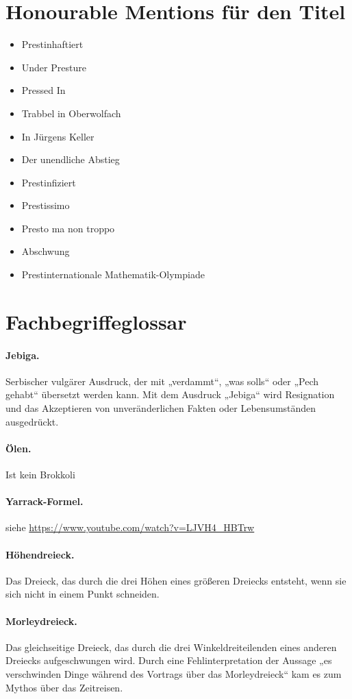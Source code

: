 \documentclass[oneside]{memoir}
\begin{document}
\section*{Honourable Mentions für den Titel}
\begin{itemize}
\item Prestinhaftiert
\item Under Presture
\item Pressed In
\item Trabbel in Oberwolfach
\item In Jürgens Keller
\item Der unendliche Abstieg
\item Prestinfiziert
\item Prestissimo
\item Presto ma non troppo
\item Abschwung
\item Prestinternationale Mathematik-Olympiade
\end{itemize}
\section*{Fachbegriffeglossar}
\paragraph{Jebiga.} Serbischer vulgärer Ausdruck, der mit „verdammt“, „was solls“ oder „Pech gehabt“ übersetzt werden kann. Mit dem Ausdruck „Jebiga“ wird Resignation und das Akzeptieren von unveränderlichen Fakten oder Lebensumständen ausgedrückt.
\paragraph{Ölen.} Ist kein Brokkoli
\paragraph{Yarrack-Formel.} siehe \url{https://www.youtube.com/watch?v=LJVH4_HBTrw}
\paragraph{Höhendreieck.}  Das Dreieck, das durch die drei Höhen eines größeren Dreiecks entsteht, wenn sie sich nicht in einem Punkt schneiden.
\paragraph{Morleydreieck.} Das gleichseitige Dreieck, das durch die drei Winkeldreiteilenden eines anderen Dreiecks aufgeschwungen wird. Durch eine Fehlinterpretation der Aussage „es verschwinden Dinge während des Vortrags  über das Morleydreieck“ kam es zum Mythos über das Zeitreisen.
\end{document}
